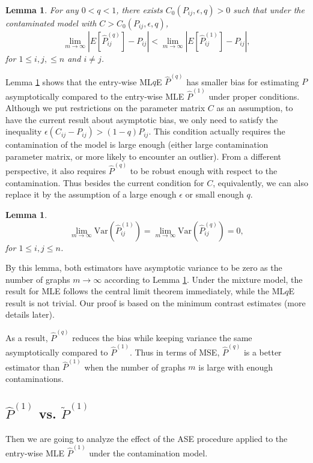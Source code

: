 \documentclass[a4paper]{article}
\newtheorem{lemma}[fact]{Lemma}
\renewcommand{\hat}{\widehat}
\begin{document}
\begin{lemma}
\label{lemma:ELqlEMLE}
For any $0 < q < 1$, there exists $C_0(P_{ij}, \epsilon, q) > 0$ such that under the contaminated model with $C > C_0(P_{ij}, \epsilon, q)$,
\[
	\lim_{m \to \infty} \left| E[\hat{P}^{(q)}_{ij}] - P_{ij} \right| < 
    \lim_{m \to \infty} \left| E[\hat{P}^{(1)}_{ij}] - P_{ij} \right|,
\]
for $1 \le i, j, \le n$ and $i \ne j$.
\end{lemma}

Lemma \ref{lemma:ELqlEMLE} shows that the entry-wise ML$q$E $\hat{P}^{(q)}$ has smaller bias for estimating $P$ asymptotically compared to the entry-wise MLE $\hat{P}^{(1)}$ under proper conditions. Although we put restrictions on the parameter matrix $C$ as an assumption, to have the current result about asymptotic bias, we only need to satisfy the inequality $\epsilon (C_{ij} - P_{ij}) > (1 - q) P_{ij}$. This condition actually requires the contamination of the model is large enough (either large contamination parameter matrix, or more likely to encounter an outlier). From a different perspective, it also requires $\hat{P}^{(q)}$ to be robust enough with respect to the contamination. Thus besides the current condition for $C$, equivalently, we can also replace it by the assumption of a large enough $\epsilon$ or small enough $q$.

\begin{lemma}
\label{lemma:VarLqlVarMLE}
\[
	\lim_{m \to \infty} \mathrm{Var}(\hat{P}^{(1)}_{ij})
    = \lim_{m \to \infty} \mathrm{Var}(\hat{P}^{(q)}_{ij}) = 0,
\]
for $1 \le i, j \le n$.
\end{lemma}

By this lemma, both estimators have asymptotic variance to be zero as the number of graphs $m \to \infty$ according to Lemma \ref{lemma:VarLqlVarMLE}. Under the mixture model, the result for MLE follows the central limit theorem immediately, while the ML$q$E result is not trivial. Our proof is based on the minimum contrast estimates (more details later).

As a result, $\hat{P}^{(q)}$ reduces the bias while keeping variance the same asymptotically compared to $\hat{P}^{(1)}$. Thus in terms of MSE, $\hat{P}^{(q)}$ is a better estimator than $\hat{P}^{(1)}$ when the number of graphs $m$ is large with enough contaminations.

\subsection{$\hat{P}^{(1)}$ vs. $\widetilde{P}^{(1)}$}
Then we are going to analyze the effect of the ASE procedure applied to the entry-wise MLE $\hat{P}^{(1)}$ under the contamination model.
\end{document}
